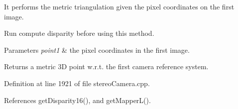 It performs the metric triangulation given the pixel coordinates on the first image. 

Run compute disparity before using this method. 
\begin{DoxyParams}{Parameters}
{\em point1} & the pixel coordinates in the first image. \\
\hline
\end{DoxyParams}
\begin{DoxyReturn}{Returns}
a metric 3D point w.\+r.\+t. the first camera reference system. 
\end{DoxyReturn}


Definition at line 1921 of file stereo\+Camera.\+cpp.



References get\+Disparity16(), and get\+Mapper\+L().



